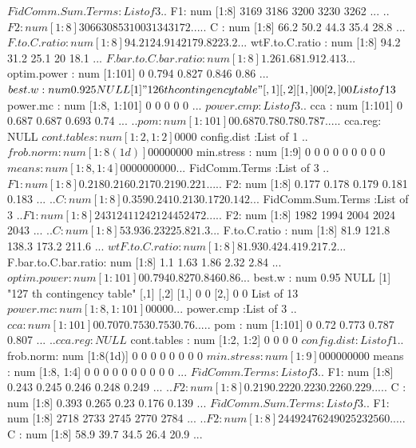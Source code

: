 \documentclass[11pt]{article} %
\begin{document}
\begin{Schunk}
\begin{Soutput}
 $ FidComm.Sum.Terms   :List of 3
  ..$ F1: num [1:8] 3169 3186 3200 3230 3262 ...
  ..$ F2: num [1:8] 3066 3085 3100 3134 3172 ...
  ..$ C : num [1:8] 66.2 50.2 44.3 35.4 28.8 ...
 $ F.to.C.ratio        : num [1:8] 94.2 124.9 142 179.8 223.2 ...
 $ wtF.to.C.ratio      : num [1:8] 94.2 31.2 25.1 20 18.1 ...
 $ F.bar.to.C.bar.ratio: num [1:8] 1.26 1.68 1.91 2.41 3 ...
 $ optim.power         : num [1:101] 0 0.794 0.827 0.846 0.86 ...
 $ best.w              : num 0.925
NULL
[1] "126 th contingency table"
     [,1] [,2]
[1,]    0    0
[2,]    0    0
List of 13
 $ power.mc            : num [1:8, 1:101] 0 0 0 0 0 ...
 $ power.cmp           :List of 3
  ..$ cca    : num [1:101] 0 0.687 0.687 0.693 0.74 ...
  ..$ pom    : num [1:101] 0 0.687 0.78 0.78 0.787 ...
  ..$ cca.reg: NULL
 $ cont.tables         : num [1:2, 1:2] 0 0 0 0
 $ config.dist         :List of 1
  ..$ frob.norm: num [1:8(1d)] 0 0 0 0 0 0 0 0
 $ min.stress          : num [1:9] 0 0 0 0 0 0 0 0 0
 $ means               : num [1:8, 1:4] 0 0 0 0 0 0 0 0 0 0 ...
 $ FidComm.Terms       :List of 3
  ..$ F1: num [1:8] 0.218 0.216 0.217 0.219 0.221 ...
  ..$ F2: num [1:8] 0.177 0.178 0.179 0.181 0.183 ...
  ..$ C : num [1:8] 0.359 0.241 0.213 0.172 0.142 ...
 $ FidComm.Sum.Terms   :List of 3
  ..$ F1: num [1:8] 2431 2411 2421 2445 2472 ...
  ..$ F2: num [1:8] 1982 1994 2004 2024 2043 ...
  ..$ C : num [1:8] 53.9 36.2 32 25.8 21.3 ...
 $ F.to.C.ratio        : num [1:8] 81.9 121.8 138.3 173.2 211.6 ...
 $ wtF.to.C.ratio      : num [1:8] 81.9 30.4 24.4 19.2 17.2 ...
 $ F.bar.to.C.bar.ratio: num [1:8] 1.1 1.63 1.86 2.32 2.84 ...
 $ optim.power         : num [1:101] 0 0.794 0.827 0.846 0.86 ...
 $ best.w              : num 0.95
NULL
[1] "127 th contingency table"
     [,1] [,2]
[1,]    0    0
[2,]    0    0
List of 13
 $ power.mc            : num [1:8, 1:101] 0 0 0 0 0 ...
 $ power.cmp           :List of 3
  ..$ cca    : num [1:101] 0 0.707 0.753 0.753 0.76 ...
  ..$ pom    : num [1:101] 0 0.72 0.773 0.787 0.807 ...
  ..$ cca.reg: NULL
 $ cont.tables         : num [1:2, 1:2] 0 0 0 0
 $ config.dist         :List of 1
  ..$ frob.norm: num [1:8(1d)] 0 0 0 0 0 0 0 0
 $ min.stress          : num [1:9] 0 0 0 0 0 0 0 0 0
 $ means               : num [1:8, 1:4] 0 0 0 0 0 0 0 0 0 0 ...
 $ FidComm.Terms       :List of 3
  ..$ F1: num [1:8] 0.243 0.245 0.246 0.248 0.249 ...
  ..$ F2: num [1:8] 0.219 0.222 0.223 0.226 0.229 ...
  ..$ C : num [1:8] 0.393 0.265 0.23 0.176 0.139 ...
 $ FidComm.Sum.Terms   :List of 3
  ..$ F1: num [1:8] 2718 2733 2745 2770 2784 ...
  ..$ F2: num [1:8] 2449 2476 2490 2523 2560 ...
  ..$ C : num [1:8] 58.9 39.7 34.5 26.4 20.9 ...

\end{Soutput}
\end{Schunk}
\end{document}
